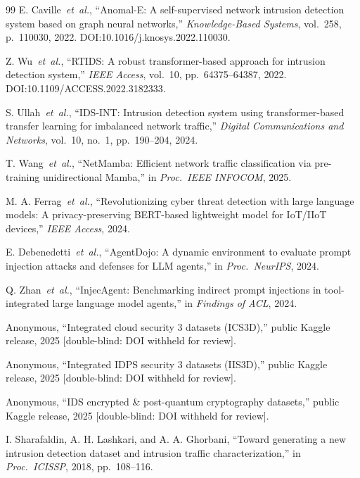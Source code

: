 \documentclass[journal,10pt,twocolumn]{IEEEtran}
\begin{document}
\begin{thebibliography}{99}
 E. Caville~\textit{et~al.}, ``Anomal-E: A self-supervised network intrusion detection system based on graph neural networks,'' \textit{Knowledge-Based Systems}, vol.~258, p.~110030, 2022. DOI:10.1016/j.knosys.2022.110030.

 Z. Wu~\textit{et~al.}, ``RTIDS: A robust transformer-based approach for intrusion detection system,'' \textit{IEEE Access}, vol.~10, pp.~64375--64387, 2022. DOI:10.1109/ACCESS.2022.3182333.

 S. Ullah~\textit{et~al.}, ``IDS-INT: Intrusion detection system using transformer-based transfer learning for imbalanced network traffic,'' \textit{Digital Communications and Networks}, vol.~10, no.~1, pp.~190--204, 2024.

 T. Wang~\textit{et~al.}, ``NetMamba: Efficient network traffic classification via pre-training unidirectional Mamba,'' in \textit{Proc.\ IEEE INFOCOM}, 2025.

 M. A. Ferrag~\textit{et~al.}, ``Revolutionizing cyber threat detection with large language models: A privacy-preserving BERT-based lightweight model for IoT/IIoT devices,'' \textit{IEEE Access}, 2024.

 E. Debenedetti~\textit{et~al.}, ``AgentDojo: A dynamic environment to evaluate prompt injection attacks and defenses for LLM agents,'' in \textit{Proc.\ NeurIPS}, 2024.

 Q. Zhan~\textit{et~al.}, ``InjecAgent: Benchmarking indirect prompt injections in tool-integrated large language model agents,'' in \textit{Findings of ACL}, 2024.

 Anonymous, ``Integrated cloud security 3 datasets (ICS3D),'' public Kaggle release, 2025 [double-blind: DOI withheld for review].

 Anonymous, ``Integrated IDPS security 3 datasets (IIS3D),'' public Kaggle release, 2025 [double-blind: DOI withheld for review].

 Anonymous, ``IDS encrypted \& post-quantum cryptography datasets,'' public Kaggle release, 2025 [double-blind: DOI withheld for review].

 I. Sharafaldin, A. H. Lashkari, and A. A. Ghorbani, ``Toward generating a new intrusion detection dataset and intrusion traffic characterization,'' in \textit{Proc.\ ICISSP}, 2018, pp.~108--116.


\end{thebibliography}
\end{document}
